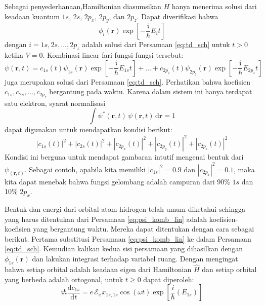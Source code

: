 \documentclass[a4paper,bahasa]{paper}
\renewcommand{\imath}{\mathfrak{i}}
\begin{document}
Sebagai penyederhanaan,Hamiltonian diasumsikan $H$ hanya menerima solusi dari
keadaan kuantum $1s$, $2s$, $2p_{x}$, $2p_{y}$, dan $2p_{z}$.
Dapat diverifikasi bahwa
%
\begin{equation}
\phi_{i}(\mathbf{r})\exp\left[ -\frac{\imath}{\hbar} E_{i}t \right]
\end{equation}
%
dengan $i = 1s, 2s, \ldots, 2p_{z}$ adalah solusi dari Persamaan \eqref{eq:td_sch}
untuk $t > 0$ ketika $V = 0$.
Kombinasi linear fari fungsi-fungsi tersebut:
%
\begin{equation}
\psi(\mathbf{r},t) =
c_{1s}(t) \psi_{1s}(\mathbf{r}) \exp\left[-\frac{\imath}{\hbar} E_{1s}t\right]
+ \ldots +
c_{2p_{z}}(t) \psi_{2p_{z}}(\mathbf{r}) \exp\left[-\frac{\imath}{\hbar} E_{2p_{z}}t\right]
\label{eq:psi_komb_lin}
\end{equation}
%
juga merupakan solusi dari Persamaan \eqref{eq:td_sch}.
Perhatikan bahwa koefisien $c_{1s}, c_{2s}, \ldots, c_{2p_{z}}$ bergantung pada waktu.
%
Karena dalam sistem ini hanya terdapat satu elektron, syarat normalisasi
\begin{equation}
\int \psi^{*}(\mathbf{r},t)\,\psi(\mathbf{r},t)\,\mathrm{d}\mathbf{r} = 1
\end{equation}
dapat digunakan untuk mendapatkan kondisi berikut:
\begin{equation}
\left| c_{1s}(t) \right|^2 + \left| c_{2s}(t) \right|^2 +
\left| c_{2p_{x}}(t) \right|^2 + \left| c_{2p_{y}}(t) \right|^2 +
\left| c_{2p_{z}}(t) \right|^2
\end{equation}
%
Kondisi ini berguna untuk mendapat gambaran intutif mengenai bentuk dari $\psi_(\mathbf{r},t)$.
Sebagai contoh, apabila kita memiliki $\left|c_{1s}\right|^2 = 0.9$ dan 
$\left|c_{2p_{x}}\right|^2 = 0.1$, maka kita dapat menebak bahwa fungsi gelombang adalah
campuran dari 90\% $1s$ dan 10\% $2p_{x}$.

Bentuk dan energi dari orbital atom hidrogen telah umum diketahui sehingga yang harus
ditentukan dari Persamaan \eqref{eq:psi_komb_lin} adalah koefisien-koefisien
yang bergantung waktu. Mereka dapat ditentukan dengan cara sebagai berikut.
Pertama substitusi Persamaan \eqref{eq:psi_komb_lin} ke dalam Persamaan \eqref{eq:td_sch}.
Kemudian kalikan kedua sisi persamaan yang dihasilkan dengan $\phi_{1s}(\mathbf{r})$
dan lakukan integrasi terhadap variabel ruang. Dengan mengingat bahwa setiap orbital
adalah keadaan eigen dari Hamiltonian $\hat{H}$ dan setiap orbital yang berbeda
adalah ortogonal, untuk $t \geq 0$ dapat diperoleh:
%
\begin{equation}
\imath\hbar\frac{\mathrm{d}c_{1s}}{\mathrm{d}t} =
e\,\mathcal{E}_{x} x_{1s,1s}\cos(\omega t)\exp\left[\frac{i}{\hbar}(E_{1s})\right]
\end{equation}
\end{document}
